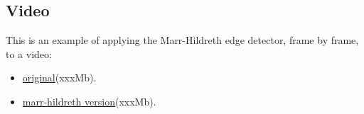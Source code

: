 \documentclass{ipol}
\numberwithin{equation}{section}
\numberwithin{table}{section}
\begin{document}
\subsection{Video}

This is an example of applying the Marr-Hildreth edge detector, frame by frame, to a video:
\begin{itemize}
	\item \href{http://iie.fing.edu.uy/~haldos/ipol/video.mov}{original}(xxxMb).
	\item \href{http://iie.fing.edu.uy/~haldos/ipol/video-marr-hildreth.mov}{marr-hildreth version}(xxxMb).
\end{itemize}

\begin{thebibliography}{9}

\end{thebibliography}
\end{document}
